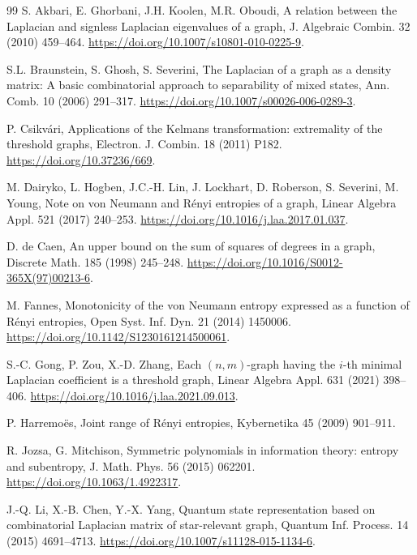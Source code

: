 \documentclass[11pt,a4paper,reqno]{amsart}
\theoremstyle{remark}
\numberwithin{equation}{section}
\begin{document}
\begin{thebibliography}{99}
\small
\setlength{\itemsep}{3pt}
S. Akbari, E. Ghorbani, J.H. Koolen, M.R. Oboudi,
A relation between the Laplacian and signless Laplacian eigenvalues of a graph,
J. Algebraic Combin. 32 (2010) 459--464.
\url{https://doi.org/10.1007/s10801-010-0225-9}.

S.L. Braunstein, S. Ghosh, S. Severini,
The Laplacian of a graph as a density matrix: A basic combinatorial approach to separability of mixed states,
Ann. Comb. 10 (2006) 291--317.
\url{https://doi.org/10.1007/s00026-006-0289-3}.

P. Csikv\'ari, Applications of the Kelmans transformation: extremality of the threshold graphs,
Electron. J. Combin. 18 (2011) P182.
\url{https://doi.org/10.37236/669}.

M. Dairyko, L. Hogben, J.C.-H. Lin, J. Lockhart, D. Roberson, S. Severini, M. Young,
Note on von Neumann and R\'enyi entropies of a graph,
Linear Algebra Appl. 521 (2017) 240--253.
\url{https://doi.org/10.1016/j.laa.2017.01.037}.

D. de Caen, An upper bound on the sum of squares of degrees in a graph,
Discrete Math. 185 (1998) 245--248.
\url{https://doi.org/10.1016/S0012-365X(97)00213-6}.

M. Fannes, Monotonicity of the von Neumann entropy expressed as a function of R\'enyi entropies,
Open Syst. Inf. Dyn. 21 (2014) 1450006.
\url{https://doi.org/10.1142/S1230161214500061}.

S.-C. Gong, P. Zou, X.-D. Zhang,
Each $(n,m)$-graph having the $i$-th minimal Laplacian coefficient is a threshold graph,
Linear Algebra Appl. 631 (2021) 398--406.
\url{https://doi.org/10.1016/j.laa.2021.09.013}.

P. Harremo\"es, Joint range of R\'enyi entropies,
Kybernetika 45 (2009) 901--911.

R. Jozsa, G. Mitchison, Symmetric polynomials in information theory: entropy and subentropy,
J. Math. Phys. 56 (2015) 062201.
\url{https://doi.org/10.1063/1.4922317}.

J.-Q. Li, X.-B. Chen, Y.-X. Yang,
Quantum state representation based on combinatorial Laplacian matrix of star-relevant graph,
Quantum Inf. Process. 14 (2015) 4691--4713.
\url{https://doi.org/10.1007/s11128-015-1134-6}.


\end{thebibliography}
\end{document}

